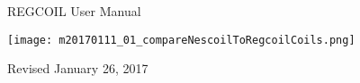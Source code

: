\begin{center}

\vspace*{1in}

{\Huge REGCOIL User Manual}

\vspace{2in}

\centerline{\texttt{[image: m20170111\_01\_compareNescoilToRegcoilCoils.png]}}


\vspace{1.0in}

Revised January 26, 2017

\end{center}

